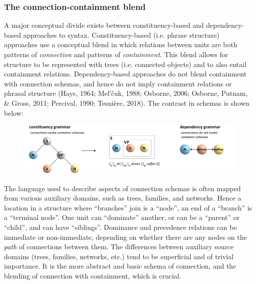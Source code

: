 \subsubsection{The connection-containment blend}

A major conceptual divide exists between constituency-based and dependency-based approaches to syntax. Constituency-based (i.e. phrase structure) approaches use a conceptual blend in which relations between units are both patterns of \textit{connection} and patterns of \textit{containment}. This blend allows for structure to be represented with trees (i.e. connected objects) and to also entail containment relations. Dependency-based approaches do not blend containment with connection schemas, and hence do not imply containment relations or phrasal structure (Hays, 1964; Melʹčuk, 1988; Osborne, 2006; Osborne, Putnam, \& Gross, 2011; Percival, 1990; Tesnière, 2018). The contrast in schemas is shown below: 

  
\begin{figure}
\includegraphics[width=\textwidth]{figures/Tilsen-img34.png}
\caption{\missingcaption}
\label{fig:}
\end{figure}
 

  The language used to describe aspects of connection schemas is often mapped from various auxiliary domains, such as trees, families, and networks. Hence a location in a structure where “branches” join is a “node”, an end of a “branch” is a “terminal node”. One unit can “dominate” another, or can be a “parent” or “child”, and can have “siblings”. Dominance and precedence relations can be immediate or non-immediate, depending on whether there are any nodes on the \textit{path} of connections between them. The differences between auxiliary source domains (trees, families, networks, etc.) tend to be superficial and of trivial importance. It is the more abstract and basic schema of connection, and the blending of connection with containment, which is crucial.   

